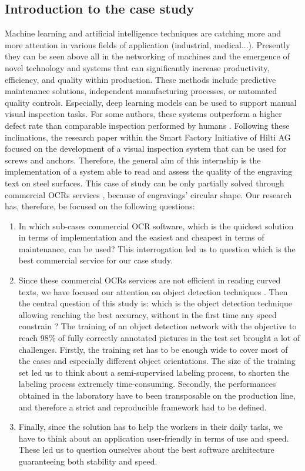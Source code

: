 \documentclass[12pt, french, a4paper]{article} %
\begin{document}
\subsection{Introduction to the case study}
Machine learning and artificial intelligence techniques are catching more and more attention in various fields of application (industrial, medical...). Presently they can be seen above all in the networking of machines and the emergence of novel technology and systems that can significantly increase productivity, efficiency, and quality within production. These methods include predictive maintenance solutions, independent manufacturing processes, or automated quality controls. Especially, deep learning models can be used to support manual visual inspection tasks. For some authors, these systems outperform a higher defect rate than comparable inspection performed by humans \cite{cha2018autonomous}. Following these inclinations, the research paper within the Smart Factory Initiative of Hilti AG focused on the development of a visual inspection system that can be used for screws and anchors. Therefore, the general aim of this internship is the implementation of a system able to read and assess the quality of the engraving text on steel surfaces. This case of study can be only partially solved through commercial \gls{OCR}s services \cite{AzureOCR, AWSOCR, GoogleOCR}, because of engravings' circular shape. Our research has, therefore, be focused on the following questions:
\begin{enumerate}
\itemsep0em 
    \item In which sub-cases commercial \gls{OCR} software, which is the quickest solution in terms of implementation and the easiest and cheapest in terms of maintenance, can be used? This interrogation led us to question which is the best commercial service for our case study.
    \item Since these commercial \gls{OCR}s services are not efficient in reading curved texts, we have focused our attention on object detection techniques \cite{girshick2015fast}. Then the central question of this study is: which is the object detection technique allowing reaching the best accuracy, without in the first time any speed constrain \cite{girshick2015region, ren2015faster, redmon2016you, liu2008robust}? The training of an object detection network with the objective to reach 98\% of fully correctly annotated pictures in the test set brought a lot of challenges. Firstly, the training set has to be enough wide to cover most of the cases and especially different object orientations. The size of the training set led us to think about a semi-supervised labeling process, to shorten the labeling process extremely time-consuming. Secondly, the performances obtained in the laboratory have to been transposable on the production line, and therefore a strict and reproducible framework had to be defined.
    \item Finally, since the solution has to help the workers in their daily tasks, we have to think about an application user-friendly in terms of use and speed. These led us to question ourselves about the best software architecture guaranteeing both stability and speed.
\end{enumerate}
\end{document}
